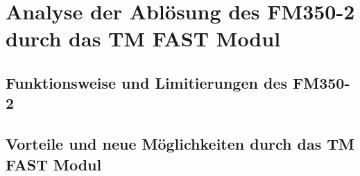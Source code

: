 










\newif\ifdraft
\draftfalse
\ifdraft

\chapter{Analyse der Ablösung des FM350-2 durch das TM FAST Modul}

\section{Funktionsweise und Limitierungen des FM350-2} 
\section{Vorteile und neue Möglichkeiten durch das TM FAST Modul} 
